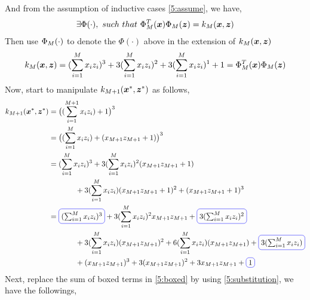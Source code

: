 \documentclass[11pt,a4paper]{article}
\newcommand{\htab}{\hspace*{0.63cm}}
\begin{document}
\htab And from the assumption of inductive cases \eqref{5:assume}, we have,
    \begin{align}
        \exists \Phi(\cdot),\ such\ that\ \Phi_{M}^{T}(\boldsymbol{x}) \Phi_{M}(\boldsymbol{z}) = k_{M}(\boldsymbol{x},\boldsymbol{z})
    \end{align}
\htab Then use $\Phi_{M}(\cdot)$ to denote the $\Phi(\cdot)$ above in the extension of $k_{M}(\boldsymbol{x},\boldsymbol{z})$
    \begin{align} 
        k_{M}(\boldsymbol{x},\boldsymbol{z}) = (\sum_{i=1}^{M} x_{i} z_{i})^{3} + 3(\sum_{i=1}^{M} x_{i} z_{i})^{2} + 3(\sum_{i=1}^{M} x_{i} z_{i})^{1} + 1 
        = \Phi_{M}^{T}(\boldsymbol{x}) \Phi_{M}(\boldsymbol{z}) \label{5:substitution}
    \end{align}
\htab Now, start to manipulate $k_{M+1}(\boldsymbol{x}^{*},\boldsymbol{z}^{*})$ as follows, 
    \begin{align}
        \knew &= \big( (\sumxzMM) + 1 \big)^{3} \\
              &= \big( (\sumxzM) + (\xzMM + 1) \big)^{3} \\
              &= (\sumxzM)^{3} + 3(\sumxzM)^{2}(\xzMM + 1) \nonumber \\
              & \htab \htab + 3(\sumxzM)(\xzMM + 1)^{2} + (\xzMM + 1)^{3} \\
              &= 
        \tikz[baseline]{ \node[draw=blue,rounded corners,anchor=base] (m1) {$(\sumxzM)^{3}$} ;}
    + 3(\sumxzM)^{2}\xzMM + 
    \tikz[baseline]{ \node[draw=blue,rounded corners,anchor=base] (m2) {$3(\sumxzM)^{2}$} ;}  \nonumber \\
              & \htab \htab + 3(\sumxzM)(\xzMM)^{2} + 6(\sumxzM)(\xzMM)+ 
    \tikz[baseline]{ \node[draw=blue,rounded corners,anchor=base] (m3) {$3(\sumxzM)$} ;} \nonumber \\
              & \htab \htab + (\xzMM)^{3} + 3(\xzMM)^{2} + 3\xzMM + 
    \tikz[baseline]{ \node[draw=blue,rounded corners,anchor=base] (m4) {$1$} ;} \label{5:boxed}
    \end{align}
\newpage
Next, replace the sum of boxed terms in \eqref{5:boxed} by using \eqref{5:substitution}, we have the followings,
\end{document}
